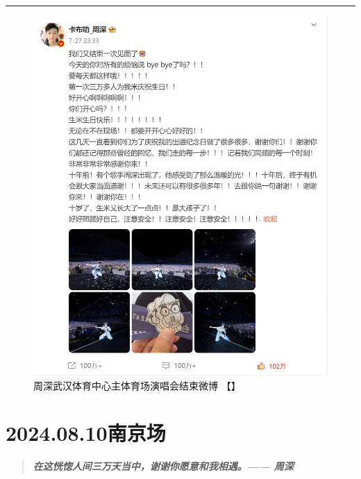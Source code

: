 \documentclass[]{ctexbook}
\begin{document}
\begin{center}\rule{0.5\linewidth}{0.5pt}\end{center}

\begin{figure}
\centering
\includegraphics{img/weibo/wuhan-20240727.png}
\caption{\label{fig:unnamed-chunk-61}周深武汉体育中心主体育场演唱会结束微博 【\citet{weibo-charlie}】}
\end{figure}

\chapter{2024.08.10南京场}\label{nanjing-20240810}

\begin{quote}
\textbf{\emph{在这恍惚人间三万天当中，谢谢你愿意和我相遇。------ 周深}}
\end{quote}
\end{document}
